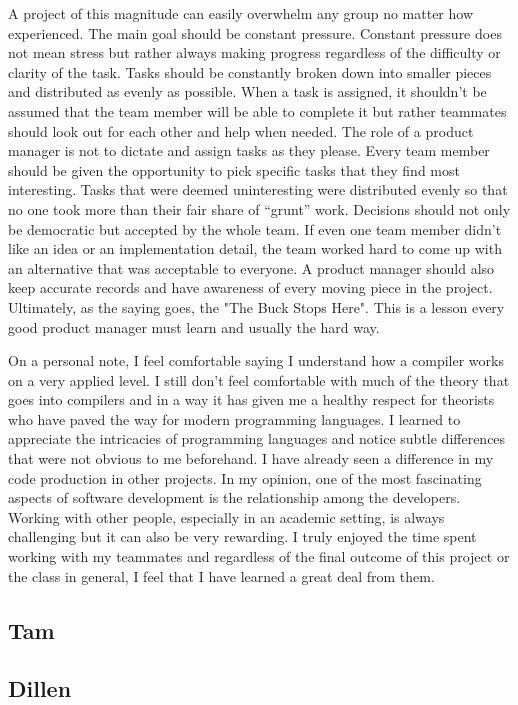 \documentclass[12pt]{report}
\begin{document}
A project of this magnitude can easily overwhelm any group no matter how experienced. The main goal should be constant pressure. Constant pressure does not mean stress but rather always making progress regardless of the difficulty or clarity of the task. Tasks should be constantly broken down into smaller pieces and distributed as evenly as possible. When a task is assigned, it shouldn’t be assumed that the team member will be able to complete it but rather teammates should look out for each other and help when needed. The role of a product manager is not to dictate and assign tasks as they please. Every team member should be given the opportunity to pick specific tasks that they find most interesting. Tasks that were deemed uninteresting were distributed evenly so that no one took more than their fair share of “grunt” work. Decisions should not only be democratic but accepted by the whole team. If even one team member didn’t like an idea or an implementation detail, the team worked hard to come up with an alternative that was acceptable to everyone. A product manager should also keep accurate records and have awareness of every moving piece in the project. Ultimately, as the saying goes, the "The Buck Stops Here". This is a lesson every good product manager must learn and usually the hard way.

On a personal note, I feel comfortable saying I understand how a compiler works on a very applied level. I still don’t feel comfortable with much of the theory that goes into compilers and in a way it has given me a healthy respect for theorists who have paved the way for modern programming languages. I learned to appreciate the intricacies of programming languages and notice subtle differences that were not obvious to me beforehand. I have already seen a difference in my code production in other projects. In my opinion, one of the most fascinating aspects of software development is the relationship among the developers. Working with other people, especially in an academic setting, is always challenging but it can also be very rewarding. I truly enjoyed the time spent working with my teammates and regardless of the final outcome of this project or the class in general, I feel that I have learned a great deal from them.

\subsection{Tam}

\subsection{Dillen}
\end{document}
